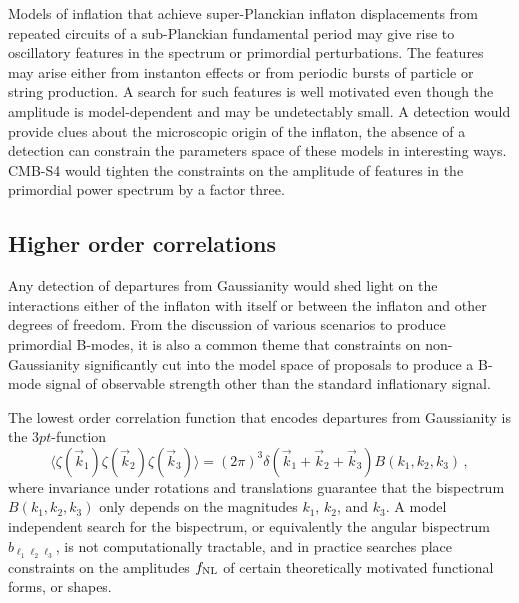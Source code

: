 Models of inflation that achieve super-Planckian inflaton displacements from repeated circuits of a sub-Planckian fundamental period may give rise to oscillatory features in the spectrum or primordial perturbations. The features may arise either from instanton effects or from periodic bursts of particle or string production. A search for such features is well motivated even though the amplitude is model-dependent and may be undetectably small. A detection would provide clues about the microscopic origin of the inflaton, the absence of a detection can constrain the parameters space of these models in interesting ways. CMB-S4 would tighten the constraints on the amplitude of features in the primordial power spectrum by a factor three. 
 
\subsection{Higher order correlations}
Any detection of departures from Gaussianity would shed light on the interactions either of the inflaton with itself or between the inflaton and other degrees of freedom. From the discussion of various scenarios to produce primordial B-modes, it is also a common theme that constraints on non-Gaussianity significantly cut into the model space of proposals to produce a B-mode signal of observable strength other than the standard inflationary signal. 

The lowest order correlation function that encodes departures from Gaussianity is the $3pt$-function
\begin{equation}
\langle\zeta(\vec{k}_1)\zeta(\vec{k}_2)\zeta(\vec{k}_3)\rangle=(2\pi)^3\delta(\vec{k}_1+\vec{k}_2+\vec{k}_3)B(k_1,k_2,k_3)\,,
\end{equation}
where invariance under rotations and translations guarantee that the bispectrum $B(k_1,k_2,k_3)$ only depends on the magnitudes $k_1$, $k_2$, and $k_3$. A model independent search for the bispectrum, or equivalently the angular bispectrum $b_{\ell_1\ell_2\ell_3}$, is not computationally tractable, and in practice searches place constraints on the amplitudes $f_{\rm NL}$ of certain theoretically motivated functional forms, or shapes.

